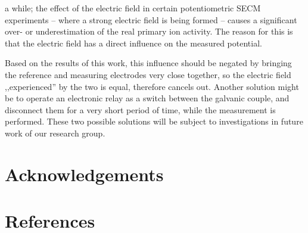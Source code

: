 \documentclass[3p]{elsarticle}
\begin{document}
a while; the effect of the electric field in certain potentiometric SECM experiments -- where a strong electric field is being formed -- causes a significant over- or underestimation of the real primary ion activity. The reason for this is that the electric field has a direct influence on the measured potential.

Based on the results of this work, this influence should be negated by bringing the reference and measuring electrodes very close together, so the electric field ,,experienced'' by the two is equal, therefore cancels out. Another solution might be to operate an electronic relay as a switch between the galvanic couple, and disconnect them for a very short period of time, while the measurement is performed. These two possible solutions will be subject to investigations in future work of our research group.


\section*{Acknowledgements}

\section*{References}
\end{document}
